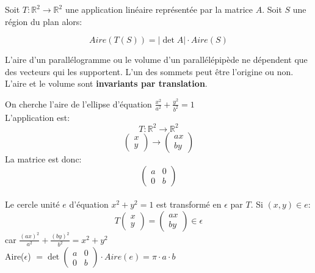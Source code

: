 \begin{theorem}
    Soit $T : \mathbb{R}^2 \to \mathbb{R}^2$  une application linéaire représentée par la matrice $A$. Soit $S$ une région du plan alors:
\begin{formule}
    \[Aire(T(S)) = |\det A| \cdot Aire(S)\]
\end{formule}
\end{theorem}
\begin{framedremark}
    L'aire d'un parallélogramme ou le volume d'un parallélépipède ne dépendent que des vecteurs qui les supportent. L'un des sommets peut être l'origine ou non. L'aire et le volume sont \textbf{invariants par translation}.
\end{framedremark}
\begin{exemple}
    On cherche l'aire de l'ellipse d'équation $\frac{x^2}{a^2} + \frac{y^2}{b^2} = 1$
    \\
    L'application est:
    \[T: \mathbb{R}^2 \to \mathbb{R}^2 \]
    \[\begin{pmatrix}
        x \\ y
    \end{pmatrix} \to \begin{pmatrix}
        ax \\ by
    \end{pmatrix}\]
    La matrice est donc: 
    \[\begin{pmatrix}
        a & 0\\ 0 & b
    \end{pmatrix}\]
    \\
    Le cercle unité $e$ d'équation $x^2 + y^2 = 1$ est transformé en $\epsilon$ par $T$. Si $(x, y) \in e$:
    \[T\begin{pmatrix}
        x \\ y
    \end{pmatrix} = \begin{pmatrix}
        ax \\ by
    \end{pmatrix} \in \epsilon\] car $\frac{(ax)^2}{a^2} + \frac{(by)^2}{b^2} = x^2 + y^2$
    \\
    Aire($\epsilon$) $= \det \begin{pmatrix}
        a & 0 \\ 0 & b
    \end{pmatrix} \cdot Aire(e) = \pi\cdot a \cdot b$
\end{exemple}




